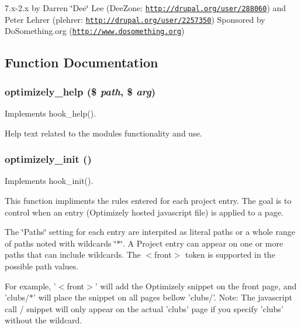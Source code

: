 7.x-\/2.x by Darren \char`\"{}Dee\char`\"{} Lee (DeeZone: \href{http://drupal.org/user/288060}{\tt http://drupal.org/user/288060}) and Peter Lehrer (plehrer: \href{http://drupal.org/user/2257350}{\tt http://drupal.org/user/2257350}) Sponsored by DoSomething.org (\href{http://www.dosomething.org}{\tt http://www.dosomething.org}) 

\subsection{Function Documentation}
\hypertarget{optimizely_8module_a8f28de2408f1d21dc8026b1c5b4f37be}{
\subsubsection[{optimizely\_\-help}]{\setlength{\rightskip}{0pt plus 5cm}optimizely\_\-help (\$ {\em path}, \/  \$ {\em arg})}}
\label{optimizely_8module_a8f28de2408f1d21dc8026b1c5b4f37be}
Implements hook\_\-help().

Help text related to the modules functionality and use. \hypertarget{optimizely_8module_a84b6132a6cd43fb33b4f482a0e4f7363}{
\subsubsection[{optimizely\_\-init}]{\setlength{\rightskip}{0pt plus 5cm}optimizely\_\-init ()}}
\label{optimizely_8module_a84b6132a6cd43fb33b4f482a0e4f7363}
Implements hook\_\-init().

This function impliments the rules entered for each project entry. The goal is to control when an entry (Optimizely hosted javascript file) is applied to a page.

The \char`\"{}Paths\char`\"{} setting for each entry are interpited as literal paths or a whole range of paths noted with wildcards \char`\"{}$\ast$\char`\"{}. A Project entry can appear on one or more paths that can include wildcards. The $<$front$>$ token is supported in the possible path values.

For example, '$<$front$>$' will add the Optimizely snippet on the front page, and 'clubs/$\ast$' will place the snippet on all pages bellow 'clubs/'. Note: The javascript call / snippet will only appear on the actual 'clubs' page if you specify 'clubs' without the wildcard.

